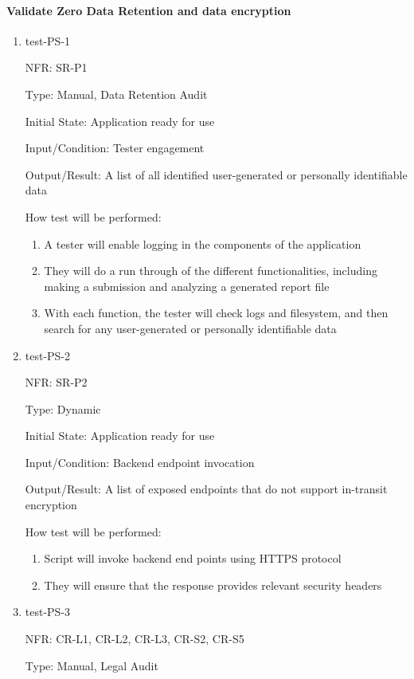 \documentclass[12pt, titlepage]{article}
\begin{document}
\paragraph{Validate Zero Data Retention and data encryption}
\begin{enumerate}
  \item{test-PS-1}
  
  NFR: SR-P1

  Type: Manual, Data Retention Audit

  Initial State: Application ready for use

  Input/Condition: Tester engagement

  Output/Result: A list of all identified user-generated or personally identifiable data

  How test will be performed:
  \begin{enumerate}
    \item A tester will enable logging in the components of the application
    \item They will do a run through of the different functionalities, including making a submission and analyzing a generated report file
    \item With each function, the tester will check logs and filesystem, and then
    search for any user-generated or personally identifiable data
  \end{enumerate}


  \item{test-PS-2}
  
  NFR: SR-P2 

  Type: Dynamic

  Initial State: Application ready for use

  Input/Condition: Backend endpoint invocation

  Output/Result: A list of exposed endpoints that do not support in-transit encryption

  How test will be performed:
  \begin{enumerate}
    \item Script will invoke backend end points using HTTPS protocol
    \item They will ensure that the response provides relevant security headers
  \end{enumerate}


  \item{test-PS-3}
  
  NFR: CR-L1, CR-L2, CR-L3, CR-S2, CR-S5

  Type: Manual, Legal Audit


\end{enumerate}
\end{document}
